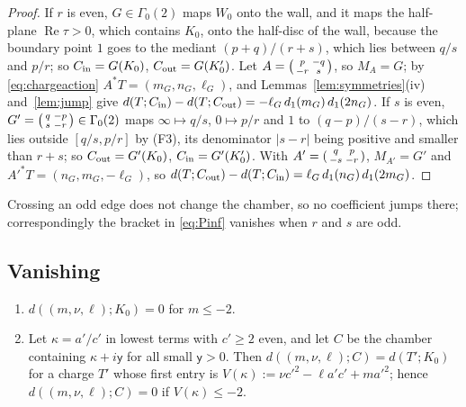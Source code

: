 \begin{proof}
If $r$ is even, $G\in\Gamma_0(2)$ maps $W_0$ onto the wall, and it maps the half-plane $\operatorname{Re}\tau>0$, which contains $K_0$, onto the half-disc of the wall, because the boundary point $1$ goes to the mediant $(p+q)/(r+s)$, which lies between $q/s$ and $p/r$; so $C_{\rm in}=G(K_0)$, $C_{\rm out}=G(K_0')$. Let $A=\begin{psmallmatrix}p&-q\\-r&s\end{psmallmatrix}$, so $M_A=G$; by \eqref{eq:chargeaction} $A^\ast T=(m_G,n_G,\ell_G)$, and Lemmas~\ref{lem:symmetries}(iv) and~\ref{lem:jump} give $d(T;C_{\rm in})-d(T;C_{\rm out})=-\ell_G\,d_1(m_G)\,d_1(2n_G)$. If $s$ is even, $G'=\begin{psmallmatrix}q&-p\\s&-r\end{psmallmatrix}\in\Gamma_0(2)$ maps $\infty\mapsto q/s$, $0\mapsto p/r$ and $1$ to $(q-p)/(s-r)$, which lies outside $[q/s,p/r]$ by (F3), its denominator $|s-r|$ being positive and smaller than $r+s$; so $C_{\rm out}=G'(K_0)$, $C_{\rm in}=G'(K_0')$. With $A'=\begin{psmallmatrix}q&p\\-s&-r\end{psmallmatrix}$, $M_{A'}=G'$ and $A'^\ast T=(n_G,m_G,-\ell_G)$, so $d(T;C_{\rm out})-d(T;C_{\rm in})=\ell_G\,d_1(n_G)\,d_1(2m_G)$.
\end{proof}

Crossing an odd edge does not change the chamber, so no coefficient jumps there; correspondingly the bracket in \eqref{eq:Pinf} vanishes when $r$ and $s$ are odd.

\subsection{Vanishing}

\begin{lemma}\label{lem:vanish}
\begin{enumerate}
\item[(i)] $d((m,\nu,\ell);K_0)=0$ for $m\le-2$.
\item[(ii)] Let $\kappa=a'/c'$ in lowest terms with $c'\ge2$ even, and let $C$ be the chamber containing $\kappa+i\mathsf y$ for all small $\mathsf y>0$. Then $d((m,\nu,\ell);C)=d(T';K_0)$ for a charge $T'$ whose first entry is $V(\kappa):=\nu c'^2-\ell a'c'+ma'^2$; hence $d((m,\nu,\ell);C)=0$ if $V(\kappa)\le-2$.
\end{enumerate}
\end{lemma}

